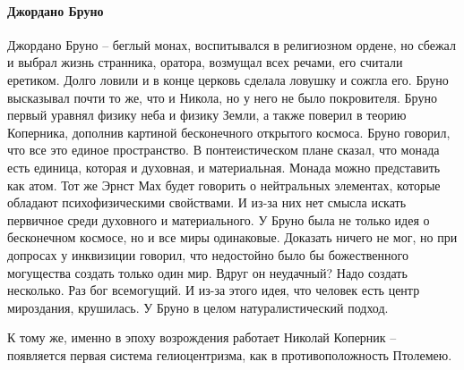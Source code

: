 \documentclass[a4paper, 12pt]{article}
\begin{document}
\paragraph{Джордано Бруно}Джордано Бруно -- беглый монах, воспитывался в религиозном ордене, но сбежал и выбрал жизнь странника, оратора, возмущал всех речами, его считали еретиком. Долго ловили и в конце церковь сделала ловушку и сожгла его. Бруно высказывал почти то же, что и Никола, но у него не было покровителя. Бруно первый уравнял физику неба и физику Земли, а также поверил в теорию Коперника, дополнив картиной бесконечного открытого космоса. Бруно говорил, что все это единое пространство. В понтеистическом плане сказал, что монада есть единица, которая и духовная, и материальная. Монада можно представить как атом. Тот же Эрнст Мах будет говорить о нейтральных элементах, которые обладают психофизическими свойствами. И из-за них нет смысла искать первичное среди духовного и материального. У Бруно была не только идея о бесконечном космосе, но и все миры одинаковые. Доказать ничего не мог, но при допросах у инквизиции говорил, что недостойно было бы божественного могущества создать только один мир. Вдруг он неудачный? Надо создать несколько. Раз бог всемогущий. И из-за этого идея, что человек есть центр мироздания, крушилась. У Бруно в целом натуралистический подход. 

К тому же, именно в эпоху возрождения работает Николай Коперник -- появляется первая система гелиоцентризма, как в противоположность Птолемею. 
\end{document}
